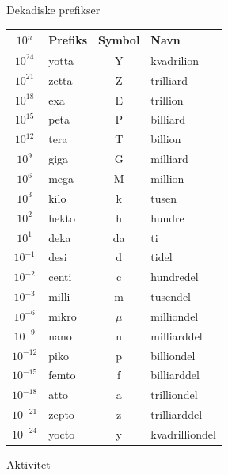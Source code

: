 \documentclass[aspectratio=169, 12pt]{beamer}
\begin{document}
\begin{frame}{Dekadiske prefikser}
  \begin{center}
  \scriptsize
  \renewcommand{\arraystretch}{1.0}
  \begin{tabular}{|c|l|c|l|}
  \hline
  \rowcolor{blue!10!black!80}
  $10^n$ & Prefiks & Symbol & Navn \\
  \hline
  $10^{24}$ & yotta & Y & kvadrilion \\
  $10^{21}$ & zetta & Z & trilliard \\
  $10^{18}$ & exa   & E & trillion \\
  $10^{15}$ & peta  & P & billiard \\
  $10^{12}$ & tera  & T & billion \\
  $10^{9}$  & giga  & G & milliard \\
  $10^{6}$  & mega  & M & million \\
  $10^{3}$  & kilo  & k & tusen \\
  $10^{2}$  & hekto & h & hundre \\
  $10^{1}$  & deka  & da & ti \\
  $10^{-1}$ & desi  & d & tidel \\
  $10^{-2}$ & centi & c & hundredel \\
  $10^{-3}$ & milli & m & tusendel \\
  $10^{-6}$ & mikro & $\mu$ & milliondel \\
  $10^{-9}$ & nano  & n & milliarddel \\
  $10^{-12}$& piko  & p & billiondel \\
  $10^{-15}$& femto & f & billiarddel \\
  $10^{-18}$& atto  & a & trilliondel \\
  $10^{-21}$& zepto & z & trilliarddel \\
  $10^{-24}$& yocto & y & kvadrilliondel \\
  \hline
  \end{tabular}
  \end{center}
\end{frame}

\begin{frame}{Aktivitet}
\end{frame}
\end{document}
